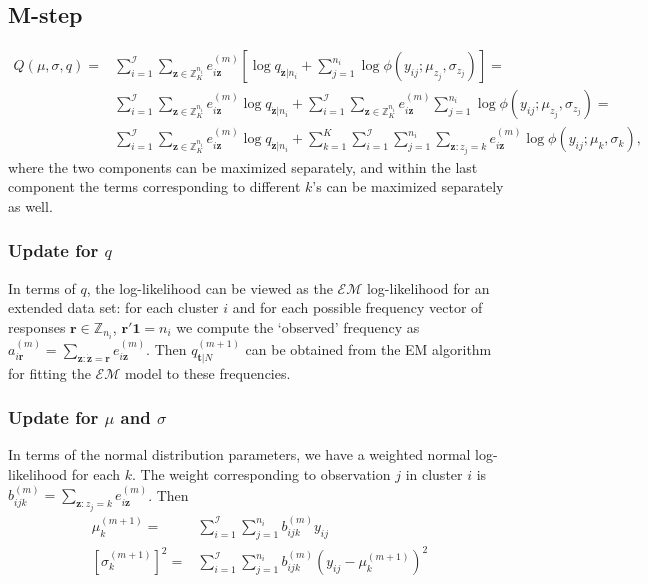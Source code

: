 \documentclass[reqno]{amsart}
\newcommand{\vv}[1]{\boldsymbol{#1}}
\newcommand{\ff}[1]{\dot{#1}}
\newcommand{\Z}[2][K]{\mathbb{Z}_{#1}^{#2}}
\newcommand{\I}{\mathcal{I}}
\newcommand{\EM}{\mathcal{EM}}
\begin{document}
\subsection{M-step}

\begin{align}
Q(\mu, \sigma, q) = & \sum_{i=1}^\I\sum_{\vv{z}\in\Z{n_i}} e_{i\vv{z}}^{(m)}   
 [\log q_{\ff{\vv{z}}|n_i}  +\sum_{j=1}^{n_i}\log \phi(y_{ij}; \mu_{z_j}, \sigma_{z_j})] =\\
 &  \sum_{i=1}^\I\sum_{\vv{z}\in\Z{n_i}} e_{i\vv{z}}^{(m)} \log q_{\ff{\vv{z}}|n_i} +
  \sum_{i=1}^\I\sum_{\vv{z}\in\Z{n_i}} e_{i\vv{z}}^{(m)}  \sum_{j=1}^{n_i}\log \phi(y_{ij}; \mu_{z_j}, \sigma_{z_j})  =\\
 &  \sum_{i=1}^\I\sum_{\vv{z}\in\Z{n_i}} e_{i\vv{z}}^{(m)} \log q_{\ff{\vv{z}}|n_i}+
  \sum_{k=1}^K \sum_{i=1}^\I \sum_{j=1}^{n_i}\sum_{\vv{z}: z_j=k} e_{i\vv{z}}^{(m)}  \log \phi(y_{ij}; \mu_k, \sigma_k),
\end{align}
where the two components can be maximized separately, and within the last component the terms corresponding to different $k$'s
can be maximized separately as well.


\subsubsection{Update for $q$}

In terms of $q$, the log-likelihood can be viewed as the $\EM$ log-likelihood for
an extended data set: for each cluster $i$ and for each possible frequency vector of responses $\vv{r}\in \mathbb{Z}_{n_i}$, $\vv{r}'\vv{1}=n_i$ 
we compute the `observed' frequency as $a_{i\vv{r}}^{(m)}   = \sum_{\vv{z}: \ff{\vv{z}}=\vv{r}}  e_{i\vv{z}}^{(m)}$. Then  
$q_{\vv{t}|N}^{(m+1)}$ can be obtained from the EM algorithm for fitting the $\EM$ model to these frequencies.


\subsubsection{Update for $\mu$ and $\sigma$}
In terms of the normal distribution parameters, we have a weighted normal log-likelihood for each $k$. 
The weight corresponding to observation $j$ in cluster $i$ is $b_{ijk}^{(m)} = \sum_{\vv{z}: z_j=k} e_{i\vv{z}}^{(m)}$.
Then 
\begin{align}
\mu_k^{(m+1)} = & \sum_{i=1}^\I \sum_{j=1}^{n_i} b_{ijk}^{(m)} y_{ij} \\
[\sigma_k^{(m+1)}]^2 = &  \sum_{i=1}^\I \sum_{j=1}^{n_i} b_{ijk}^{(m)} (y_{ij} - \mu_k^{(m+1)})^2
\end{align}

\end{document}
